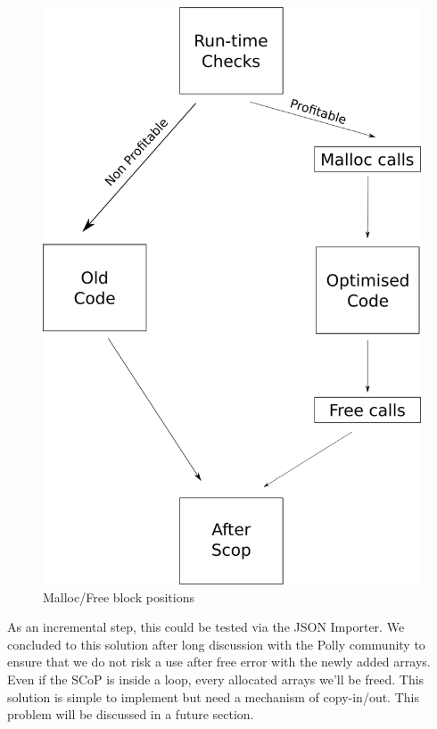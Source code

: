 \begin{figure}
\centering
\includegraphics[scale=0.3]{gfx/HeapAlloc/ScopSplit.png}
\caption{Malloc/Free block positions}
\label{fig:HeapAllocPlace}
\end{figure}

As an incremental step, this could be tested via the JSON Importer. We concluded to this solution after long discussion with the Polly community to ensure that we do not risk a use after free error with the newly added arrays. Even if the SCoP is inside a loop, every allocated arrays we'll be freed. This solution is simple to implement but need a mechanism of copy-in/out. This problem will be discussed in a future section.

